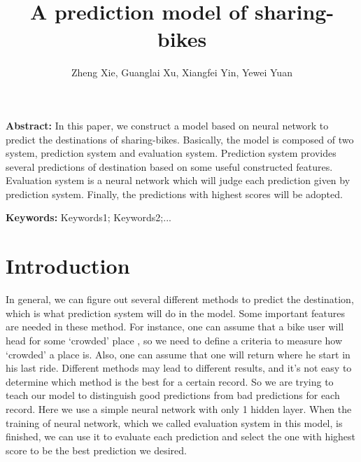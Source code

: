 \documentclass[hyperref]{article}
\theoremstyle{nonumberplain}
\begin{document}
    \title{\bf A prediction model of sharing-bikes} 
    \date{}
    \author{\sffamily Zheng Xie, Guanglai Xu, Xiangfei Yin, Yewei Yuan\\}
    \renewcommand{\thefootnote}{\fnsymbol{footnote}}
    \maketitle
    
    {\noindent\small{\bf Abstract:}
        In this paper, we construct a model based on neural network to predict the destinations 
        of sharing-bikes. Basically, the model is composed of two system, prediction system and 
        evaluation system. Prediction system provides several predictions of destination based 
        on some useful constructed features. Evaluation system is a neural network which will 
        judge each prediction given by prediction system. Finally, the predictions with highest
        scores will be adopted. 
         
    }
    
    \vspace{1ex}
    {\noindent\small{\bf Keywords:}
        Keywords1; Keywords2;...}
    \section{Introduction}
    In general, we can figure out several different methods to predict the destination, which 
    is what prediction system will do in the model. Some important features are needed in these 
    method. For instance, one can assume that a bike user will head for some ‘crowded’ place , 
    so we need to define a criteria to measure how ‘crowded’ a place is. Also, one can assume 
    that one will return where he start in his last ride. Different methods may lead to 
    different results, and it’s not easy to determine which method is the best for a certain 
    record. So we are trying to teach our model to distinguish good predictions from bad 
    predictions for each record. Here we use a simple neural network with only 1 hidden layer. 
    When the training of neural network, which we called evaluation system in this model, is 
    finished, we can use it to evaluate each prediction and select the one with highest score 
    to be the best prediction we desired.
\end{document}
